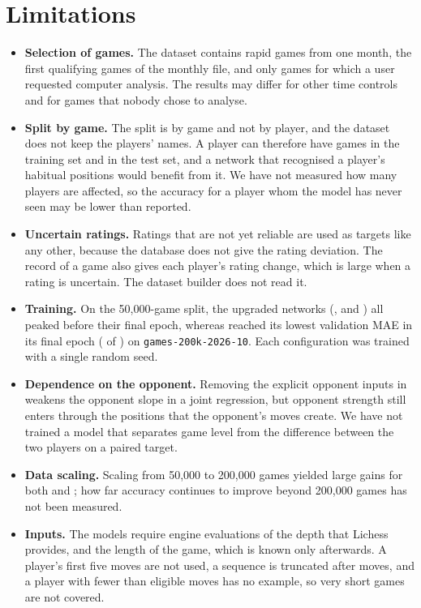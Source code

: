 \documentclass[11pt]{article}
\begin{document}
\section{Limitations}
\label{sec:limits}

\begin{itemize}
\item \textbf{Selection of games.} The dataset contains rapid games from one
month, the first qualifying games of the monthly file, and only games for
which a user requested computer analysis. The results may differ for other
time controls and for games that nobody chose to analyse.
\item \textbf{Split by game.} The split is by game and not by player, and the
dataset does not keep the players' names. A player can therefore have games
in the training set and in the test set, and a network that recognised a
player's habitual positions would benefit from it. We have not measured how
many players are affected, so the accuracy for a player whom the model has
never seen may be lower than reported.
\item \textbf{Uncertain ratings.} Ratings that are not yet reliable are used
as targets like any other, because the database does not give the rating
deviation. The record of a game also gives each player's rating change, which
is large when a rating is uncertain. The dataset builder does not read it.
\item \textbf{Training.} On the 50{,}000-game split, the upgraded networks
(,  and ) all
peaked before their final epoch, whereas  reached its lowest
validation MAE in its final epoch ( of ) on
\texttt{games-200k-2026-10}. Each configuration was trained with a single
random seed.
\item \textbf{Dependence on the opponent.} Removing the explicit opponent inputs
in  weakens the opponent slope in a joint regression, but
opponent strength still enters through the positions that the opponent's moves
create. We have not trained a model that separates game level from the
difference between the two players on a paired target.
\item \textbf{Data scaling.} Scaling from 50{,}000 to 200{,}000 games yielded
large gains for both  and ; how far
accuracy continues to improve beyond 200{,}000 games has not been measured.
\item \textbf{Inputs.} The models require engine evaluations of the depth
that Lichess provides, and the length of the game, which is known only
afterwards. A player's first five moves are not used, a sequence is truncated
after  moves, and a player with fewer than
 eligible moves has no example, so very short games are
not covered.
\end{itemize}
\end{document}
